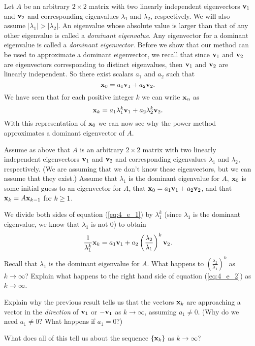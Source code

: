 Let $A$ be an arbitrary $2 \times 2$ matrix with two linearly independent eigenvectors $\mathbf{v}_1$ and $\mathbf{v}_2$ and corresponding eigenvalues $\lambda_1$ and $\lambda_2$, respectively. We will also assume $|\lambda_1| > |\lambda_2|$. An eigenvalue  whose absolute value is larger than that of any other eigenvalue is called a \emph{dominant eigenvalue}. Any eigenvector for a dominant eigenvalue is called a \emph{dominant eigenvector}. Before we show that our method can be used to approximate a dominant eigenvector, we recall that since $\mathbf{v}_1$ and $\mathbf{v}_2$ are eigenvectors corresponding to distinct eigenvalues, then $\mathbf{v}_1$ and $\mathbf{v}_2$ are linearly independent. So there exist scalars $a_1$ and $a_2$ such that 
\[\mathbf{x}_0 = a_1 \mathbf{v}_1 + a_2 \mathbf{v}_2.\]
We have seen that for each positive integer $k$ we can write $\mathbf{x}_n$ as 
\begin{equation} \label{eq:4_e_1}
\mathbf{x}_k = a_1 \lambda_1^k \mathbf{v}_1 + a_2 \lambda_2^k \mathbf{v}_2. 
\end{equation}
With this representation of $\mathbf{x}_0$ we can now see why the power method approximates a dominant eigenvector of $A$. 



\begin{activity} \label{act:4_e_1} Assume as above that $A$ is an arbitrary $2 \times 2$ matrix with two linearly independent eigenvectors $\mathbf{v}_1$ and $\mathbf{v}_2$ and corresponding eigenvalues $\lambda_1$ and $\lambda_2$, respectively. (We are assuming that we don't know these eigenvectors, but we can assume that they exist.) Assume that $\lambda_1$ is the dominant eigenvalue for $A$, $\mathbf{x}_0$ is some initial guess to an eigenvector for $A$, that $\mathbf{x}_0 = a_1 \mathbf{v}_1 + a_2 \mathbf{v}_2$, and that $\mathbf{x}_k = A\mathbf{x}_{k-1}$ for $k \geq 1$.
	\ba
	\item We divide both sides of equation (\ref{eq:4_e_1}) by $\lambda_1^k$ (since $\lambda_1$ is the dominant eigenvalue, we know that $\lambda_1$ is not $0$) to obtain
\begin{equation} \label{eq:4_e_2}
\frac{1}{\lambda_1^k}\mathbf{x}_k = a_1 \mathbf{v}_1 + a_2 \left(\frac{\lambda_2}{\lambda_1}\right)^k \mathbf{v}_2.
\end{equation} 
Recall that $\lambda_1$ is the dominant eigenvalue for $A$. What happens to $\left( \frac{\lambda_2}{\lambda_1} \right)^k$ as $k \to \infty$? Explain what happens to the right hand side of equation (\ref{eq:4_e_2}) as $k \to \infty$.
	
	
	
	\item Explain why the previous result tells us that the vectors $\mathbf{x}_k$ are approaching a vector in the \emph{direction} of $\mathbf{v}_1$ or $-\mathbf{v}_1$ as $k \to \infty$, assuming $a_1 \neq 0$. (Why do we need $a_1 \neq 0$? What happens if $a_1=0$?)

	
	
	\item What does all of this tell us about the sequence $\{\mathbf{x}_k\}$ as $k \to \infty$?
	
	
	
	
	\ea
\end{activity}



